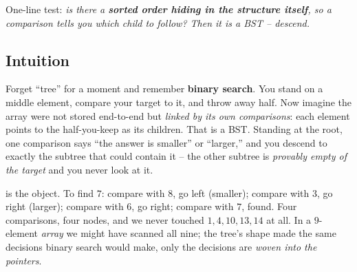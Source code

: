 \begin{recognitionbox}
One-line test: \emph{is there a \textbf{sorted order hiding in the structure itself}, so a
comparison tells you which child to follow? Then it is a BST -- descend.}
\end{recognitionbox}

\subsection{Intuition}

Forget ``tree'' for a moment and remember \textbf{binary search}. You stand on a middle element,
compare your target to it, and throw away half. Now imagine the array were not stored end-to-end but
\emph{linked by its own comparisons}: each element points to the half-you-keep as its children. That
is a BST. Standing at the root, one comparison says ``the answer is smaller'' or ``larger,'' and you
descend to exactly the subtree that could contain it -- the other subtree is \emph{provably empty of
the target} and you never look at it.

 is the object. To find $7$: compare with $8$, go left (smaller); compare with
$3$, go right (larger); compare with $6$, go right; compare with $7$, found. Four comparisons, four
nodes, and we never touched $1,4,10,13,14$ at all. In a $9$-element \emph{array} we might have
scanned all nine; the tree's shape made the same decisions binary search would make, only the
decisions are \emph{woven into the pointers}.

